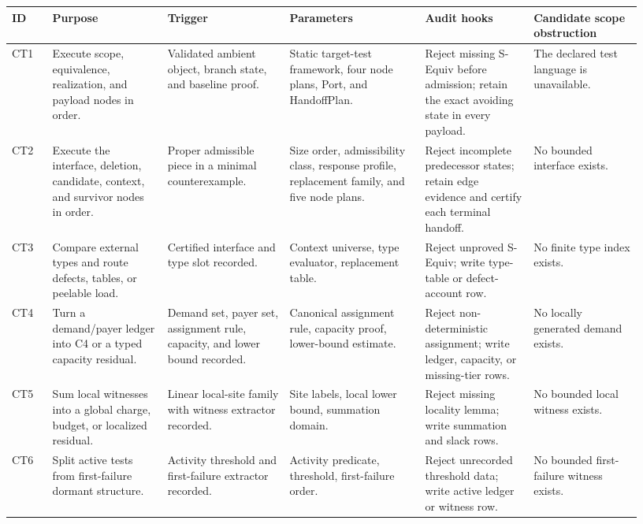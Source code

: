 \documentclass[
  11pt,
]{article}
\theoremstyle{definition}
\begin{document}
\begingroup
\scriptsize
\setlength{\tabcolsep}{1.2pt}
\begin{longtable}[]{@{}
  >{\raggedright\arraybackslash}p{0.06\linewidth}
  >{\raggedright\arraybackslash}p{0.17\linewidth}
  >{\raggedright\arraybackslash}p{0.18\linewidth}
  >{\raggedright\arraybackslash}p{0.20\linewidth}
  >{\raggedright\arraybackslash}p{0.16\linewidth}
  >{\raggedright\arraybackslash}p{0.16\linewidth}@{}}
\toprule\noalign{}
ID & Purpose & Trigger & Parameters & Audit hooks & Candidate scope obstruction \\
\midrule\noalign{}
\endhead
\bottomrule\noalign{}
\endlastfoot
CT1 & Execute scope, equivalence, realization, and payload nodes in order. & Validated ambient object, branch state, and baseline proof. & Static target-test framework, four node plans, Port, and HandoffPlan. & Reject missing S-Equiv before admission; retain the exact avoiding state in every payload. & The declared test language is unavailable. \\
CT2 & Execute the interface, deletion, candidate, context, and survivor nodes in order. & Proper admissible piece in a minimal counterexample. & Size order, admissibility class, response profile, replacement family, and five node plans. & Reject incomplete predecessor states; retain edge evidence and certify each terminal handoff. & No bounded interface exists. \\
CT3 & Compare external types and route defects, tables, or peelable load. & Certified interface and type slot recorded. & Context universe, type evaluator, replacement table. & Reject unproved S-Equiv; write type-table or defect-account row. & No finite type index exists. \\
CT4 & Turn a demand/payer ledger into C4 or a typed capacity residual. & Demand set, payer set, assignment rule, capacity, and lower bound recorded. & Canonical assignment rule, capacity proof, lower-bound estimate. & Reject non-deterministic assignment; write ledger, capacity, or missing-tier rows. & No locally generated demand exists. \\
CT5 & Sum local witnesses into a global charge, budget, or localized residual. & Linear local-site family with witness extractor recorded. & Site labels, local lower bound, summation domain. & Reject missing locality lemma; write summation and slack rows. & No bounded local witness exists. \\
CT6 & Split active tests from first-failure dormant structure. & Activity threshold and first-failure extractor recorded. & Activity predicate, threshold, first-failure order. & Reject unrecorded threshold data; write active ledger or witness row. & No bounded first-failure witness exists. \\

\end{longtable}
\end{document}
